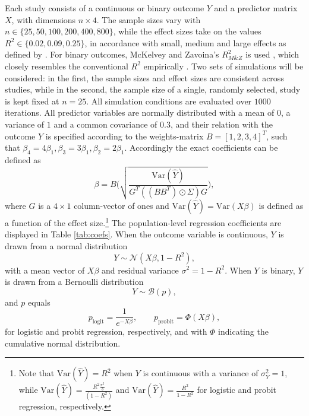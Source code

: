 \documentclass[]{interact}
\theoremstyle{plain}%
\theoremstyle{definition}
\theoremstyle{remark}
\begin{document}
Each study consists of a continuous or binary outcome \(Y\) and a
predictor matrix \(X\), with dimensions \(n \times 4\). The sample sizes
vary with \(n \in \{25, 50, 100, 200, 400, 800\}\), while the effect
sizes take on the values \(R^2 \in \{0.02, 0.09, 0.25\}\), in accordance
with small, medium and large effects as defined by \citet{cohen_1988}.
For binary outcomes, McKelvey and Zavoina's \(R^2_{M\&Z}\) is used
\citep{mckelvey_zavoina_1975}, which closely resembles the conventional
\(R^2\) empirically
\citep{hagle_mitchell_goodness_1992, demaris_explained_2002}. Two sets
of simulations will be considered: in the first, the sample sizes and
effect sizes are consistent across studies, while in the second, the
sample size of a single, randomly selected, study is kept fixed at
\(n = 25\). All simulation conditions are evaluated over \(1000\)
iterations. All predictor variables are normally distributed with a mean
of \(0\), a variance of \(1\) and a common covariance of \(0.3\), and
their relation with the outcome \(Y\) is specified according to the
weights-matrix \(B = [1,2,3,4]^T\), such that
\(\beta_4 = 4\beta_1, \beta_3 = 3\beta_1, \beta_2 = 2\beta_1\).
Accordingly the exact coefficients can be defined as \[
\beta = B \Bigg(\sqrt{\frac{\text{Var}(\hat{Y})}{G^T ((B B^T) \odot \Sigma) G }}\Bigg),
\] where \(G\) is a \(4 \times 1\) column-vector of ones and
\(\text{Var}(\hat{Y}) = \text{Var}(X\beta)\) is defined as a function of
the effect size.\footnote{Note that \(\text{Var}(\hat{Y}) = R^2\) when
  \(Y\) is continuous with a variance of \(\sigma^2_Y = 1\), while
  \(\text{Var}(\hat{Y}) = \frac{R^2\frac{\pi^2}{3}}{(1 - R^2)}\) and
  \(\text{Var}(\hat{Y}) = \frac{R^2}{1 - R^2}\) for logistic and probit
  regression, respectively.} The population-level regression
coefficients are displayed in Table \ref{tab:coefs}. When the outcome
variable is continuous, \(Y\) is drawn from a normal distribution \[
Y \sim \mathcal{N}(X\beta, 1 - R^2),
\] with a mean vector of \(X\beta\) and residual variance
\(\sigma^2 = 1-R^2\). When \(Y\) is binary, \(Y\) is drawn from a
Bernoulli distribution \[
Y \sim \mathcal{B}(p),
\] and \(p\) equals \[
p_{\text{logit}} = \frac{1}{e^{-X\beta}}, 
~~~~~~~~~
p_{\text{probit}} = \Phi(X\beta),
\] for logistic and probit regression, respectively, and with \(\Phi\)
indicating the cumulative normal distribution.
\end{document}
